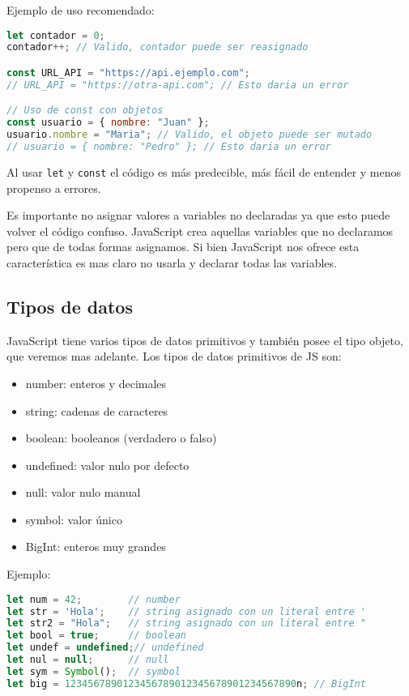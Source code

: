 \documentclass{book}
\begin{document}
Ejemplo de uso recomendado:

\begin{lstlisting}[language=JavaScript, caption=Uso de let y const]
let contador = 0;
contador++; // Valido, contador puede ser reasignado

const URL_API = "https://api.ejemplo.com";
// URL_API = "https://otra-api.com"; // Esto daria un error

// Uso de const con objetos
const usuario = { nombre: "Juan" };
usuario.nombre = "Maria"; // Valido, el objeto puede ser mutado
// usuario = { nombre: "Pedro" }; // Esto daria un error
\end{lstlisting}

Al usar \texttt{let} y \texttt{const} el código es más predecible, más fácil de entender y menos propenso a errores.

Es importante no asignar valores a variables no declaradas ya que esto puede volver el código confuso. JavaScript crea aquellas variables que no declaramos pero que de todas formas asignamos. Si bien JavaScript nos ofrece esta característica es mas claro no usarla y declarar todas las variables.


\subsection{Tipos de datos}
JavaScript tiene varios tipos de datos primitivos y también posee el tipo objeto, que veremos mas adelante.
Los tipos de datos primitivos de JS son:
\begin{itemize}
    \item number: enteros y decimales
    \item string: cadenas de caracteres
    \item boolean: booleanos (verdadero o falso)
    \item undefined: valor nulo por defecto
    \item null: valor nulo manual
    \item symbol: valor único
    \item BigInt: enteros muy grandes
\end{itemize}

Ejemplo:

\begin{lstlisting}[language=JavaScript, caption=Tipos primitivos]
let num = 42;        // number
let str = 'Hola';    // string asignado con un literal entre '
let str2 = "Hola";   // string asignado con un literal entre "
let bool = true;     // boolean
let undef = undefined;// undefined
let nul = null;      // null
let sym = Symbol();  // symbol
let big = 1234567890123456789012345678901234567890n; // BigInt
\end{lstlisting}
\end{document}
